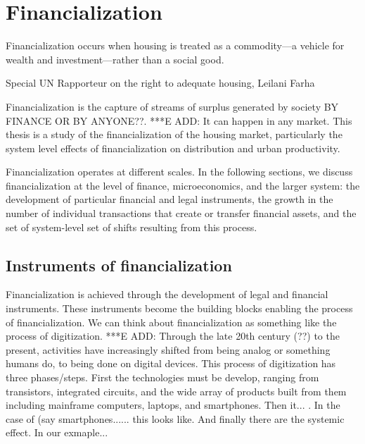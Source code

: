 \chapter{Financialization} \label{chapter-financialization}
\epigraph{Financialization occurs when housing is treated as a commodity---a vehicle for wealth and investment---rather than a social good.}{Special UN Rapporteur on the right to adequate housing, Leilani Farha \cite{farhaReportFinancializationHousing2017}}

Financialization is the capture of streams of surplus generated by society BY FINANCE OR BY ANYONE??. ***E ADD: It can happen in any market. This thesis is a study of the financialization of the housing market, particularly the system level effects of financialization on distribution and urban productivity. %

Financialization operates at different scales. In the following sections, we discuss financialization at the level of finance, microeconomics, and the larger system: the development of particular financial and legal instruments, the growth in the number of individual transactions that create or transfer financial assets, and the set of system-level set of shifts resulting from this process. 

\section{Instruments of financialization }
Financialization is achieved through the development of legal and financial instruments. 
These instruments become the building blocks enabling the process of financialization. %
We can think about financialization as something like the process of \gls{digitization}. ***E ADD: Through the late 20th century (??) to the present,  activities have increasingly shifted  from being analog or something humans do, to being done on digital devices. This process of digitization has three phases/steps. First the technologies must be develop, ranging from  transistors, integrated circuits, and the wide array of products built from them including mainframe computers, laptops, and smartphones. Then it... . In the case of (say smartphones...... this looks like. And finally there are the systemic effect. In our exmaple...

